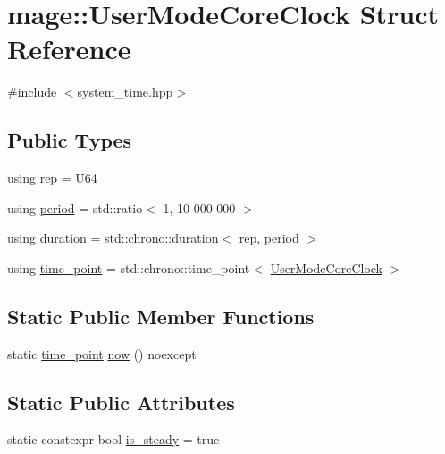 \hypertarget{structmage_1_1_user_mode_core_clock}{}\section{mage\+:\+:User\+Mode\+Core\+Clock Struct Reference}
\label{structmage_1_1_user_mode_core_clock}


{\ttfamily \#include $<$system\+\_\+time.\+hpp$>$}

\subsection*{Public Types}
\begin{DoxyCompactItemize}
\item 
using \hyperlink{structmage_1_1_user_mode_core_clock_a25466352767fc603342fd366ceaf6dcf}{rep} = \hyperlink{namespacemage_a6672cf3c861707ce4a3235a3eb43941d}{U64}
\item 
using \hyperlink{structmage_1_1_user_mode_core_clock_a533be01d2ab1284fc6ee2701bd44424d}{period} = std\+::ratio$<$ 1, 10 \textquotesingle{}000 \textquotesingle{}000 $>$
\item 
using \hyperlink{structmage_1_1_user_mode_core_clock_ae6dbb916dc171587bca6faa7510882fa}{duration} = std\+::chrono\+::duration$<$ \hyperlink{structmage_1_1_user_mode_core_clock_a25466352767fc603342fd366ceaf6dcf}{rep}, \hyperlink{structmage_1_1_user_mode_core_clock_a533be01d2ab1284fc6ee2701bd44424d}{period} $>$
\item 
using \hyperlink{structmage_1_1_user_mode_core_clock_a765f0c91417367ed676ffcde829ab365}{time\+\_\+point} = std\+::chrono\+::time\+\_\+point$<$ \hyperlink{structmage_1_1_user_mode_core_clock}{User\+Mode\+Core\+Clock} $>$
\end{DoxyCompactItemize}
\subsection*{Static Public Member Functions}
\begin{DoxyCompactItemize}
\item 
static \hyperlink{structmage_1_1_user_mode_core_clock_a765f0c91417367ed676ffcde829ab365}{time\+\_\+point} \hyperlink{structmage_1_1_user_mode_core_clock_a79614771eb0eb46a43283c87a18f339b}{now} () noexcept
\end{DoxyCompactItemize}
\subsection*{Static Public Attributes}
\begin{DoxyCompactItemize}
\item 
static constexpr bool \hyperlink{structmage_1_1_user_mode_core_clock_a041a1090219a8b03a5ac35ff251ef05a}{is\+\_\+steady} = true
\end{DoxyCompactItemize}


